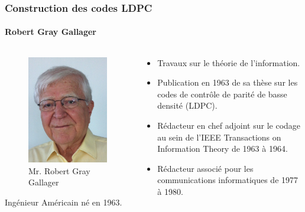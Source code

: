 \documentclass{beamer}
\begin{document}
    \begin{frame}
        \frametitle{Construction des codes LDPC}
        \framesubtitle{Robert Gray Gallager}
        \begin{columns}
            \begin{column}{5cm}
                \begin{figure}[!h]
                    \centering
                    \includegraphics[scale=0.2]{Robert_Gallager.jpg} 
                    \caption{Mr. Robert Gray Gallager} 
                    \label{fig:gallager}
                \end{figure}
                Ingénieur Américain né en 1963.
            \end{column}
            
            \begin{column}{5cm}
                \begin{itemize}
                    \item Travaux sur le théorie de l'information.
                    \item Publication en 1963 de sa thèse sur les codes de contrôle de parité de basse densité (LDPC).
                    \item Rédacteur en chef adjoint sur le codage au sein de l’IEEE Transactions on Information Theory de 1963 à 1964.
                    \item Rédacteur associé pour les communications informatiques de 1977 à 1980.
                \end{itemize}
            \end{column}
            \end{columns}
    \end{frame}
\end{document}
